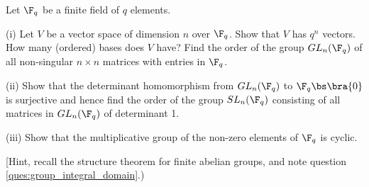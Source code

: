 \begin{problem}\label{que:gl_n_sl_n} 
Let $\F_q$ be a finite field of $q$ elements.
\ben
\item [(i)] Let $V$ be a vector space of dimension $n$ over $\F_q$. Show that $V$ has $q^n$ vectors. How many (ordered) bases does $V$ have? Find the order of the group $GL_n(\F_q)$ of all non-singular $n \times n$ matrices with entries in $\F_q$.
\item [(ii)] Show that the determinant homomorphism from $GL_n(\F_q)$ to $\F_q\bs\bra{0}$ is surjective and hence find the order of the group $SL_n(\F_q)$ consisting of all matrices in $GL_n(\F_q)$ of determinant 1.
\item [(iii)] Show that the multiplicative group of the non-zero elements of $\F_q$ is cyclic.

[Hint, recall the structure theorem for finite abelian groups, and note question \ref{ques:group_integral_domain}.)
\een
\end{problem}

